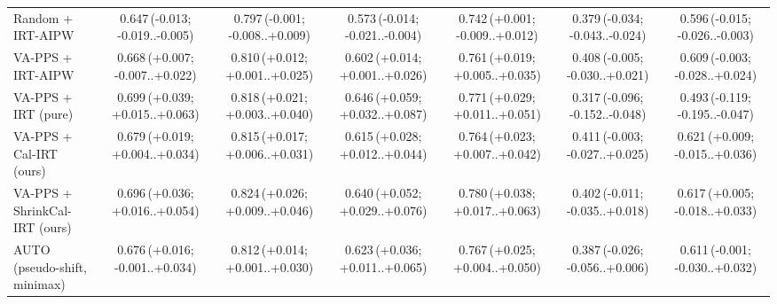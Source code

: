 \begin{tabular}{lcccccc}
Random + IRT-AIPW & 0.647\,\scriptsize(-0.013; -0.019..-0.005) & 0.797\,\scriptsize(-0.001; -0.008..+0.009) & 0.573\,\scriptsize(-0.014; -0.021..-0.004) & 0.742\,\scriptsize(+0.001; -0.009..+0.012) & 0.379\,\scriptsize(-0.034; -0.043..-0.024) & 0.596\,\scriptsize(-0.015; -0.026..-0.003) \\
VA-PPS + IRT-AIPW & 0.668\,\scriptsize(+0.007; -0.007..+0.022) & 0.810\,\scriptsize(+0.012; +0.001..+0.025) & 0.602\,\scriptsize(+0.014; +0.001..+0.026) & 0.761\,\scriptsize(+0.019; +0.005..+0.035) & 0.408\,\scriptsize(-0.005; -0.030..+0.021) & 0.609\,\scriptsize(-0.003; -0.028..+0.024) \\
VA-PPS + IRT (pure) & 0.699\,\scriptsize(+0.039; +0.015..+0.063) & 0.818\,\scriptsize(+0.021; +0.003..+0.040) & 0.646\,\scriptsize(+0.059; +0.032..+0.087) & 0.771\,\scriptsize(+0.029; +0.011..+0.051) & 0.317\,\scriptsize(-0.096; -0.152..-0.048) & 0.493\,\scriptsize(-0.119; -0.195..-0.047) \\
VA-PPS + Cal-IRT (ours) & 0.679\,\scriptsize(+0.019; +0.004..+0.034) & 0.815\,\scriptsize(+0.017; +0.006..+0.031) & 0.615\,\scriptsize(+0.028; +0.012..+0.044) & 0.764\,\scriptsize(+0.023; +0.007..+0.042) & 0.411\,\scriptsize(-0.003; -0.027..+0.025) & 0.621\,\scriptsize(+0.009; -0.015..+0.036) \\
VA-PPS + ShrinkCal-IRT (ours) & 0.696\,\scriptsize(+0.036; +0.016..+0.054) & 0.824\,\scriptsize(+0.026; +0.009..+0.046) & 0.640\,\scriptsize(+0.052; +0.029..+0.076) & 0.780\,\scriptsize(+0.038; +0.017..+0.063) & 0.402\,\scriptsize(-0.011; -0.035..+0.018) & 0.617\,\scriptsize(+0.005; -0.018..+0.033) \\
AUTO (pseudo-shift, minimax) & 0.676\,\scriptsize(+0.016; -0.001..+0.034) & 0.812\,\scriptsize(+0.014; +0.001..+0.030) & 0.623\,\scriptsize(+0.036; +0.011..+0.065) & 0.767\,\scriptsize(+0.025; +0.004..+0.050) & 0.387\,\scriptsize(-0.026; -0.056..+0.006) & 0.611\,\scriptsize(-0.001; -0.030..+0.032) \\
\bottomrule
\end{tabular}
